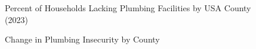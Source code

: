 \documentclass[
  letterpaper,
  DIV=11,
  numbers=noendperiod]{scrartcl}
\begin{document}
\begin{figure}


\caption{\label{fig-2}Percent of Households Lacking Plumbing Facilities
by USA County (2023)}

\end{figure}%

\begin{figure}


\caption{\label{fig-3}Change in Plumbing Insecurity by County}

\end{figure}%
\end{document}
